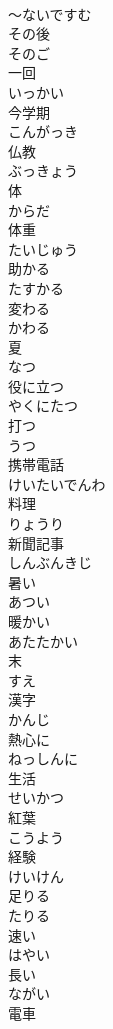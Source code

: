 \documentclass[8pt]{extreport}
\begin{document}
\begin{CJK}{UTF8}{min}
\\	～ないですむ
\\	その後	
\\	そのご
\\	一回	
\\	いっかい
\\	今学期	
\\	こんがっき
\\	仏教	
\\	ぶっきょう
\\	体	
\\	からだ
\\	体重	
\\	たいじゅう
\\	助かる	
\\	たすかる
\\	変わる	
\\	かわる
\\	夏	
\\	なつ
\\	役に立つ	
\\	やくにたつ
\\	打つ	
\\	うつ
\\	携帯電話	
\\	けいたいでんわ
\\	料理	
\\	りょうり
\\	新聞記事	
\\	しんぶんきじ
\\	暑い	
\\	あつい
\\	暖かい	
\\	あたたかい
\\	末	
\\	すえ
\\	漢字	
\\	かんじ
\\	熱心に	
\\	ねっしんに
\\	生活	
\\	せいかつ
\\	紅葉	
\\	こうよう
\\	経験	
\\	けいけん
\\	足りる	
\\	たりる
\\	速い	
\\	はやい
\\	長い	
\\	ながい
\\	電車	

\end{CJK}
\end{document}
